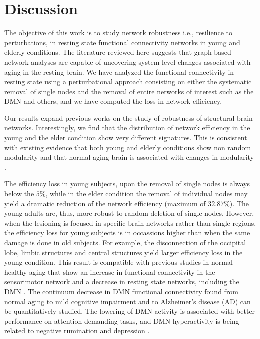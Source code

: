 \documentclass[12pt,a4paper]{article}
\begin{document}
\section{Discussion}
\label{discussion}

The objective of this work is to study network robustness i.e., resilience to
perturbations, in resting state functional connectivity networks in young and elderly conditions.
The literature reviewed here suggests that graph-based network
analyses are capable of uncovering system-level changes associated with
aging in the resting brain. 
We have analyzed the functional connectivity in resting state using a perturbational approach consisting on either the systematic removal of single nodes and the removal of entire networks of interest such as the DMN and others, and we have computed the loss in network efficiency.

Our results expand previous works on the study of robustness of
structural brain networks. %
Interestingly, we find that the distribution of network efficiency in the young and the elder condition show very different signatures. This is consistent with existing evidence \cite{meunier_age-related_2009} that both young and elderly conditions show non random modularity and that normal aging brain is associated with changes in modularity \cite{song_age-related_2014}.

The efficiency loss in young subjects, upon the removal of single nodes is always below the $5\%$, while in the elder condition the removal of individual nodes may yield a dramatic reduction of the network efficiency (maximum of $32.87\%$).
The young adults are, thus, more robust to random deletion of single nodes. However, when the lesioning is focused in specific brain networks rather than single regions, the efficiency loss for young subjects is in occassions higher than when the same damage is done in old subjects. For example, the disconnection of the occipital lobe, limbic structures and central structures yield larger efficiency loss in the young condition. This result is compatible with previous studies in normal healthy aging that show an increase in functional connectivity in the sensorimotor network and a decrease in resting state networks, including the DMN \cite{song_age-related_2014}.
The continuum decrease in DMN functional connectivity found from normal aging to mild cognitive impairment and to Alzheimer's disease (AD) can be quantitatively studied. The lowering of DMN activity is associated with better performance on attention-demanding tasks, and DMN hyperactivity is being related to negative rumination and depression \cite{whitfield-gabrieli_default_2012}.    
\end{document}

